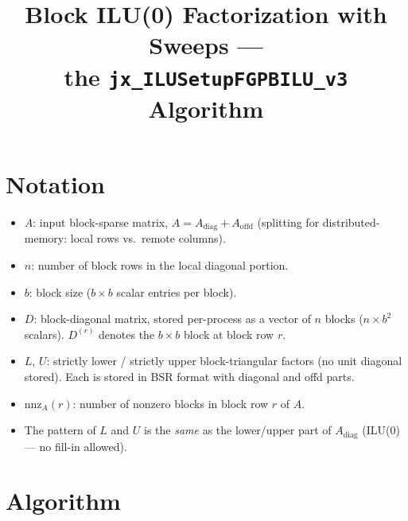 \documentclass[11pt,a4paper]{article}
\title{Block ILU(0) Factorization with Sweeps --- \\ the {\tt jx\_ILUSetupFGPBILU\_v3} Algorithm}
\author{}
\date{}
\begin{document}
\maketitle

\section{Notation}

\begin{itemize}
    \item $A$: input block-sparse matrix, $A = A_{\text{diag}} + A_{\text{offd}}$
          (splitting for distributed-memory: local rows vs.\ remote columns).
    \item $n$: number of block rows in the local diagonal portion.
    \item $b$: block size ($b \times b$ scalar entries per block).
    \item $D$: block-diagonal matrix, stored per-process as a vector of $n$ blocks
          ($n \times b^2$ scalars).  $D^{(r)}$ denotes the $b \times b$ block at
          block row $r$.
    \item $L$, $U$: strictly lower / strictly upper block-triangular factors
          (no unit diagonal stored).  Each is stored in BSR format with diagonal
          and offd parts.
    \item $\text{nnz}_A(r)$: number of nonzero blocks in block row $r$ of $A$.
    \item The pattern of $L$ and $U$ is the \emph{same} as the lower/upper part
          of $A_{\text{diag}}$ (ILU(0) --- no fill-in allowed).
\end{itemize}

\section{Algorithm}
\end{document}
